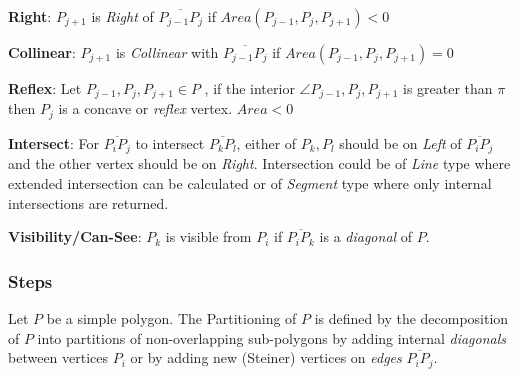\begin{list}{}{}
\item {\bf Right}: $P_{j+1}$ is {\em Right} of $ \overline{P_{j-1} P_j}$ if $Area( P_{j-1}, P_j,  P_{j+1}) < 0$ 

\item {\bf Collinear}: $P_{j+1}$ is {\em Collinear} with $ \overline{P_{j-1} P_j}$ if $Area( P_{j-1}, P_j,  P_{j+1}) = 0$ 

\item {\bf Reflex}: Let  $ P_{j-1}, P_j,  P_{j+1} \in P $ , if the interior $\angle P_{j-1}, P_j,  P_{j+1}$ is greater than $\pi$  then $P_j$  is a concave or {\em reflex} vertex. $Area < 0$

\item {\bf Intersect}: For  $\overline{P_i P_j}$ to intersect $\overline{P_k P_l}$, either of $P_k, P_l$ should be on {\em Left} of  $\overline{P_i P_j}$ and the other vertex should be on {\em Right}. Intersection could be of {\em Line} type where extended intersection can be calculated or of {\em Segment} type where only internal intersections are returned.

\item {\bf Visibility/Can-See}: $P_k$ is visible from $P_i$ if $\overline{P_i P_k}$ is a {\em diagonal} of $P$. 

\end{list}

\subsubsection{Steps}
Let $P$ be a simple polygon.  The Partitioning of $P$ is defined by the decomposition of $P$ into partitions of non-overlapping sub-polygons by adding internal {\em diagonals} between vertices  $P_i$ or by adding new (Steiner) vertices on {\em edges} $\overline{P_i P_j}$.

